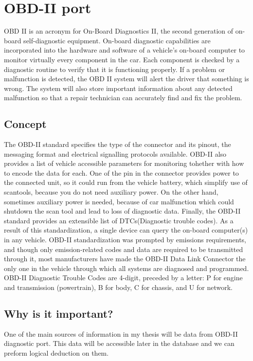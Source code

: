 \section{OBD-II port}
OBD II is an acronym for On-Board Diagnostics II, the second generation of on-board self-diagnostic equipment. On-board diagnostic capabilities are incorporated into the hardware and software of a vehicle's on-board computer to monitor virtually every component in the car. Each component is checked by a diagnostic routine to verify that it is functioning properly. If a problem or malfunction is detected, the OBD II system will alert the driver that something is wrong. The system will also store important information about any detected malfunction so that a repair technician can accurately find and fix the problem.
\subsection{Concept}
The OBD-II standard specifies the type of the connector and its pinout, the messaging format and electrical signalling protocols available. OBD-II also provides a list of vehicle accessible parameters for monitoring tohether with how to encode the data for each. One of the pin in the connector provides power to the connected unit, so it could run from the vehicle battery, which simplify use of scantools, because you do not need auxiliary power. On the other hand, sometimes auxiliary power is needed, because of car malfunction which could shutdown the scan tool and lead to loss of diagnostic data. Finally, the OBD-II standard provides an extensible list of DTCs(Diagnostic trouble codes). As a result of this standardization, a single device can query the on-board computer(s) in any vehicle. OBD-II standardization was prompted by emissions requirements, and though only emission-related codes and data are required to be transmitted through it, most manufacturers have made the OBD-II Data Link Connector the only one in the vehicle through which all systems are diagnosed and programmed. OBD-II Diagnostic Trouble Codes are 4-digit, preceded by a letter: P for engine and transmission (powertrain), B for body, C for chassis, and U for network. \cite{obdiso}
\subsection{Why is it important?}
One of the main sources of information in my thesis will be data from OBD-II diagnostic port. This data will be accessible later in the database and we can preform logical deduction on them.
